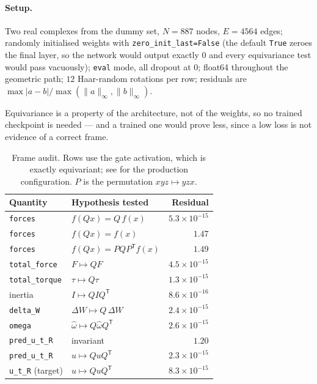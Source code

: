 \documentclass[11pt,a4paper]{report}
\theoremstyle{definition}
\theoremstyle{remark}
\newcommand{\pyfunc}[1]{\texttt{#1}}
\begin{document}
\paragraph{Setup.} Two real complexes from the dummy set, $N=887$ nodes,
$E=4564$ edges; randomly initialised weights with
\texttt{zero\_init\_last=False} (the default \texttt{True} zeroes the final
layer, so the network would output exactly $0$ and every equivariance test
would pass vacuously); \pyfunc{eval} mode, all dropout at $0$; float64
throughout the geometric path; $12$ Haar-random rotations per row; residuals
are $\max|a-b|/\max(\|a\|_\infty,\|b\|_\infty)$.

Equivariance is a property of the architecture, not of the weights, so no
trained checkpoint is needed --- and a trained one would prove less, since a
low loss is not evidence of a correct frame.

\begin{table}[htbp]
\centering
\begin{tabular}{llr}
\toprule
Quantity & Hypothesis tested & Residual \\
\midrule
\texttt{forces} & $f(Qx)=Q\,f(x)$ & $5.3\times10^{-15}$ \\
\texttt{forces} & $f(Qx)=f(x)$ & $1.47$ \\
\texttt{forces} & $f(Qx)=PQP^{\mathsf T}f(x)$ & $1.49$ \\
\midrule
\texttt{total\_force} & $F\mapsto QF$ & $4.5\times10^{-15}$ \\
\texttt{total\_torque} & $\tau\mapsto Q\tau$ & $1.3\times10^{-15}$ \\
inertia & $I\mapsto QIQ^{\mathsf T}$ & $8.6\times10^{-16}$ \\
\texttt{delta\_W} & $\Delta W\mapsto Q\,\Delta W$ & $2.4\times10^{-15}$ \\
\texttt{omega} & $\widehat\omega\mapsto Q\widehat\omega Q^{\mathsf T}$ & $2.6\times10^{-15}$ \\
\midrule
\texttt{pred\_u\_t\_R} & invariant & $1.20$ \\
\texttt{pred\_u\_t\_R} & $u\mapsto QuQ^{\mathsf T}$ & $2.3\times10^{-15}$ \\
\texttt{u\_t\_R} (target) & $u\mapsto QuQ^{\mathsf T}$ & $8.3\times10^{-15}$ \\
\bottomrule
\end{tabular}
\caption{Frame audit. Rows use the gate activation, which is exactly
equivariant; see  for the production configuration.
$P$ is the permutation $xyz\mapsto yzx$.}
\label{tab:head-residuals}
\end{table}
\end{document}
